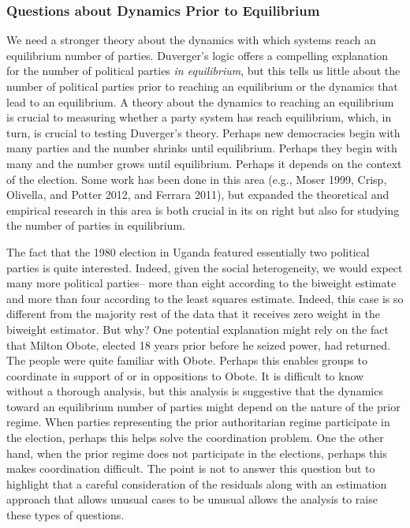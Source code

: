 \documentclass[12pt]{article}
\begin{document}

\subsubsection*{Questions about Dynamics Prior to Equilibrium}

We need a stronger theory about the dynamics with which systems reach an equilibrium number of parties. Duverger's logic offers a compelling explanation for the number of political parties \textit{in equilibrium}, but this tells us little about the number of political parties prior to reaching an equilibrium or the dynamics that lead to an equilibrium. 
A theory about the dynamics to reaching an equilibrium is crucial to measuring whether a party system has reach equilibrium, which, in turn, is crucial to testing Duverger's theory. 
Perhaps new democracies begin with many parties and the number shrinks until equilibrium. 
Perhaps they begin with many and the number grows until equilibrium. 
Perhaps it depends on the context of the election. 
Some work has been done in this area (e.g.,  Moser 1999, Crisp, Olivella, and Potter 2012, and Ferrara 2011), but expanded the theoretical and empirical research in this area is both crucial in its on right but also for studying the number of parties in equilibrium. 

The fact that the 1980 election in Uganda featured essentially two political parties is quite interested. Indeed, given the social heterogeneity, we would expect many more political parties-- more than eight according to the biweight estimate and more than four according to the least squares estimate. 
Indeed, this case is so different from the majority rest of the data that it receives zero weight in the biweight estimator. 
But why? 
One potential explanation might rely on the fact that Milton Obote, elected 18 years prior before he seized power, had returned. 
The people were quite familiar with Obote. 
Perhaps this enables groups to coordinate in support of or in oppositions to Obote. 
It is difficult to know without a thorough analysis, but this analysis is suggestive that the dynamics toward an equilibrium number of parties might depend on the nature of the prior regime. 
When parties representing the prior authoritarian regime participate in the election, perhaps this helps solve the coordination problem. 
One the other hand, when the prior regime does not participate in the elections, perhaps this makes coordination difficult. 
The point is not to answer this question but to highlight that a careful consideration of the residuals along with an estimation approach that allows unusual cases to be unusual allows the analysis to raise these types of questions.
\end{document}
